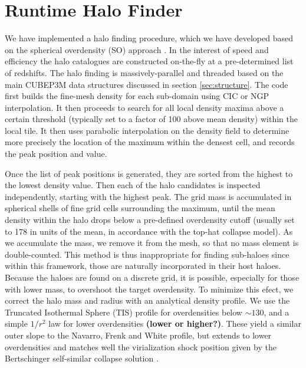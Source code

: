 \section{Runtime Halo Finder}
\label{sec:halo}


We have implemented a halo finding procedure, which we have developed 
based on the spherical overdensity (SO) approach \citep{1994MNRAS.271..676L}.
In the interest of speed and efficiency the halo catalogues are constructed 
on-the-fly at a pre-determined list of redshifts. The halo finding is 
massively-parallel and threaded based on the main {\small CUBEP3M} data structures 
discussed in section \ref{sec:structure}. The code first builds the 
fine-mesh density for each sub-domain using CIC or NGP interpolation. It then 
proceeds to search for all local density maxima above a certain
threshold (typically set to a factor of 100 above mean density) within the local tile. 
It then uses parabolic interpolation on the density field to determine more precisely
the location of the maximum within the densest cell, and records the peak 
position and value. %

Once the list of peak positions is generated, they are sorted from the highest 
to the lowest density value. Then each of the halo candidates is inspected 
independently, starting with the highest peak. The grid mass is accumulated 
in spherical shells of fine grid cells surrounding the maximum, until the 
mean density within the halo drops below a pre-defined overdensity cutoff 
(usually set to 178 in units of the mean, in accordance with the top-hat 
collapse model). As we accumulate the mass, we remove it from the mesh, so that no 
mass element is double-counted. This method is thus inappropriate for finding 
sub-haloes since within this framework, those are naturally incorporated in their 
host haloes. Because the haloes are found on a discrete grid, it is 
possible, especially for those with lower mass, to overshoot the target overdensity.
To minimize this efect, we correct the halo mass and radius with an analytical density profile. 
We use the Truncated Isothermal Sphere (TIS) 
profile \citep{1999MNRAS.307..203S,2001MNRAS.325..468I} for overdensities below 
$\sim130$, and a simple $1/r^2$ law for lower overdensities {\bf (lower or higher?)}. 
These yield a similar outer slope to the Navarro, Frenk and White 
\citep[NFW][]{1997ApJ...490..493N} profile, but extends to lower overdensities
and matches well the virialization shock position given by the Bertschinger 
self-similar collapse solution \citep{1985ApJS...58...39B}.


